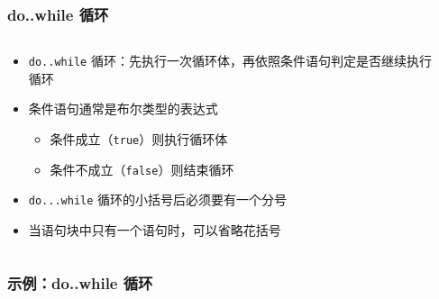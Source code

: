 \begin{frame}[fragile]
    \frametitle{do..while 循环}

    \begin{columns}
        \begin{overlayarea}{\textwidth}{.7\textheight}
            \begin{itemize}
                \item \lstinline|do..while| 循环：先执行一次循环体，再依照条件语句判定是否继续执行循环

                \item 条件语句通常是布尔类型的表达式

                    \begin{itemize}
                        \item<2-> 条件成立（\lstinline|true|）则执行循环体
                        \item<3-> 条件不成立（\lstinline|false|）则结束循环
                    \end{itemize}

                \item<4-> \lstinline|do...while| 循环的小括号后必须要有一个分号

                \item<5-> 当语句块中只有一个语句时，可以省略花括号
            \end{itemize}
        \end{overlayarea}

        \begin{overlayarea}{\textwidth}{.3\textheight}
            
        \end{overlayarea}
    \end{columns}
\end{frame}

\begin{frame}[fragile]
    \frametitle{示例：do..while 循环}

    
\end{frame}

